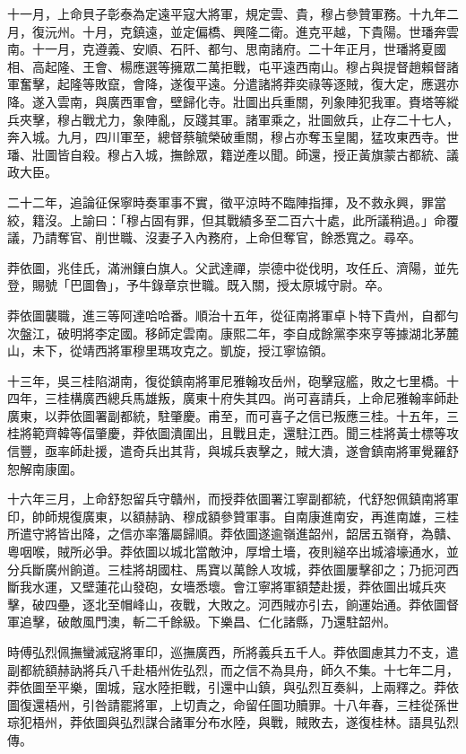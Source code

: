 \begin{pinyinscope}
十一月，上命貝子彰泰為定遠平寇大將軍，規定雲、貴，穆占參贊軍務。十九年二月，復沅州。十月，克鎮遠，並定偏橋、興隆二衛。進克平越，下貴陽。世璠奔雲南。十一月，克遵義、安順、石阡、都勻、思南諸府。二十年正月，世璠將夏國相、高起隆、王會、楊應選等擁眾二萬拒戰，屯平遠西南山。穆占與提督趙賴督諸軍奮擊，起隆等敗竄，會降，遂復平遠。分遣諸將莽奕祿等逐賊，復大定，應選亦降。遂入雲南，與廣西軍會，壁歸化寺。壯圖出兵重關，列象陣犯我軍。賚塔等縱兵夾擊，穆占戰尤力，象陣亂，反踐其軍。諸軍乘之，壯圖斂兵，止存二十七人，奔入城。九月，四川軍至，總督蔡毓榮破重關，穆占亦奪玉皇閣，猛攻東西寺。世璠、壯圖皆自殺。穆占入城，撫餘眾，籍逆產以聞。師還，授正黃旗蒙古都統、議政大臣。

二十二年，追論征保寧時奏軍事不實，徵平涼時不臨陣指揮，及不救永興，罪當絞，籍沒。上諭曰：「穆占固有罪，但其戰績多至二百六十處，此所議稍過。」命覆議，乃請奪官、削世職、沒妻子入內務府，上命但奪官，餘悉寬之。尋卒。

莽依圖，兆佳氏，滿洲鑲白旗人。父武達禪，崇德中從伐明，攻任丘、濟陽，並先登，賜號「巴圖魯」，予牛錄章京世職。既入關，授太原城守尉。卒。

莽依圖襲職，進三等阿達哈哈番。順治十五年，從征南將軍卓卜特下貴州，自都勻次盤江，破明將李定國。移師定雲南。康熙二年，李自成餘黨李來亨等據湖北茅麓山，未下，從靖西將軍穆里瑪攻克之。凱旋，授江寧協領。

十三年，吳三桂陷湖南，復從鎮南將軍尼雅翰攻岳州，砲擊寇艦，敗之七里橋。十四年，三桂構廣西總兵馬雄叛，廣東十府失其四。尚可喜請兵，上命尼雅翰率師赴廣東，以莽依圖署副都統，駐肇慶。甫至，而可喜子之信已叛應三桂。十五年，三桂將範齊韓等偪肇慶，莽依圖潰圍出，且戰且走，還駐江西。聞三桂將黃士標等攻信豐，亟率師赴援，遣奇兵出其背，與城兵衷擊之，賊大潰，遂會鎮南將軍覺羅舒恕解南康圍。

十六年三月，上命舒恕留兵守贛州，而授莽依圖署江寧副都統，代舒恕佩鎮南將軍印，帥師規復廣東，以額赫訥、穆成額參贊軍事。自南康進南安，再進南雄，三桂所遣守將皆出降，之信亦率籓屬歸順。莽依圖遂逾嶺進韶州，韶居五嶺脊，為贛、粵咽喉，賊所必爭。莽依圖以城北當敵沖，厚增土墻，夜則縋卒出城濬壕通水，並分兵斷廣州餉道。三桂將胡國柱、馬寶以萬餘人攻城，莽依圖屢擊卻之；乃扼河西斷我水運，又壁蓮花山發砲，女墻悉壞。會江寧將軍額楚赴援，莽依圖出城兵夾擊，破四壘，逐北至帽峰山，夜戰，大敗之。河西賊亦引去，餉運始通。莽依圖督軍追擊，破敵風門澳，斬二千餘級。下樂昌、仁化諸縣，乃還駐韶州。

時傅弘烈佩撫蠻滅寇將軍印，巡撫廣西，所將義兵五千人。莽依圖慮其力不支，遣副都統額赫訥將兵八千赴梧州佐弘烈，而之信不為具舟，師久不集。十七年二月，莽依圖至平樂，圍城，寇水陸拒戰，引還中山鎮，與弘烈互奏糾，上兩釋之。莽依圖復還梧州，引咎請罷將軍，上切責之，命留任圖功贖罪。十八年春，三桂從孫世琮犯梧州，莽依圖與弘烈謀合諸軍分布水陸，與戰，賊敗去，遂復桂林。語具弘烈傳。


\end{pinyinscope}
